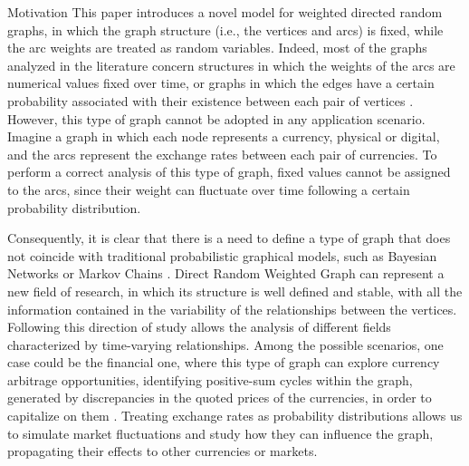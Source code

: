 \begin{projsection}{Motivation}
	This paper introduces a novel model for weighted directed random graphs, in which the graph structure (i.e., the vertices and arcs) is fixed, while the arc weights are treated as random variables. Indeed, most of the graphs analyzed in the literature concern structures in which the weights of the arcs are numerical values fixed over time, or graphs in which the edges have a certain probability associated with their existence between each pair of vertices \cite{Exp_Random_Graph}. 
	However, this type of graph cannot be adopted in any application scenario. 
	Imagine a graph in which each node represents a currency, physical or digital, and the arcs represent the exchange rates between each pair of currencies. 
	To perform a correct analysis of this type of graph, fixed values cannot be assigned to the arcs, since their weight can fluctuate over time following a certain probability distribution.
	
	Consequently, it is clear that there is a need to define a type of graph that does not coincide with traditional probabilistic graphical models, such as Bayesian Networks or Markov Chains \cite{Probabilistic_Graphical_Models}.
	Direct Random Weighted Graph can represent a new field of research, in which its structure is well defined and stable, with all the information contained in the variability of the relationships between the vertices.
	Following this direction of study allows the analysis of different fields characterized by time-varying relationships. 
	Among the possible scenarios, one case could be the financial one, where this type of graph can explore currency arbitrage opportunities, identifying positive-sum cycles within the graph, generated by discrepancies in the quoted prices of the currencies, in order to capitalize on them \cite{CurrencyArbitrage}.
	Treating exchange rates as probability distributions allows us to simulate market fluctuations and study how they can influence the graph, propagating their effects to other currencies or markets.
\end{projsection}